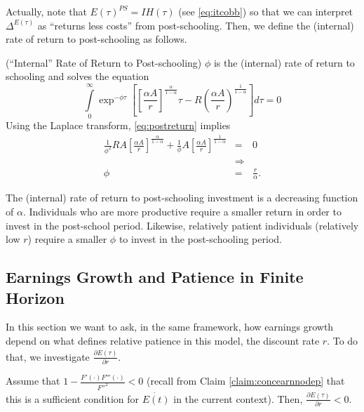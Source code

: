 \indent Actually, note that $E(\tau)^{PS} = IH(\tau)$ (see \eqref{eq:itcobb}) so that we can interpret $\Delta^{E(\tau)}$ as ``returns less costs'' from post-schooling. Then, we define the (internal) rate of return to post-schooling as follows.

\begin{definition} (``Internal'' Rate of Return to Post-schooling)
$\phi$ is the (internal) rate of return to schooling and solves the equation
\begin{equation}
\int \limits _{0} ^{\infty} \exp^{- \phi \tau} \left[ \left[ \frac{\alpha A}{r} \right]^{\frac{\alpha}{1-\alpha}} \tau - R \left( \frac{\alpha A}{r} \right)^{\frac{1}{1 - \alpha}} \right] d \tau = 0 \label{eq:postreturn}
\end{equation}
\noindent Using the Laplace transform, \eqref{eq:postreturn} implies
\begin{eqnarray}
\frac{1}{\phi^2} RA \left[ \frac{\alpha A}{r} \right]^{\frac{\alpha}{1-\alpha}} + \frac{1}{\phi} A \left[ \frac{\alpha A}{r} \right]^{\frac{1}{1-\alpha}} &=& 0 \nonumber \\
&\Rightarrow& \nonumber \\
\phi &=& \frac{r}{\alpha}.
\end{eqnarray}
\end{definition}

\indent The (internal) rate of return to post-schooling investment is a decreasing function of $\alpha$. Individuals who are more productive require a smaller return in order to invest in the post-school period. Likewise, relatively patient individuals (relatively low $r$) require a smaller $\phi$ to invest in the post-schooling period.

\subsection{Earnings Growth and Patience in Finite Horizon}
In this section we want to ask, in the same framework, how earnings growth depend on what defines relative patience in this model, the discount rate $r$. To do that, we investigate $\frac{\partial \dot{E(\tau)}}{\partial r}$.

\begin{claim} \label{claim:moreconcwithighr}
Assume that $1 - \frac{F'(\cdot) F'''(\cdot)}{{F''}^2} < 0$ (recall from Claim \ref{claim:concearnnodep} that this is a sufficient condition for $\dot{E(t)}$ in the current context). Then, $\frac{\partial \dot{E(\tau)}}{\partial r} < 0$.
\end{claim} 

